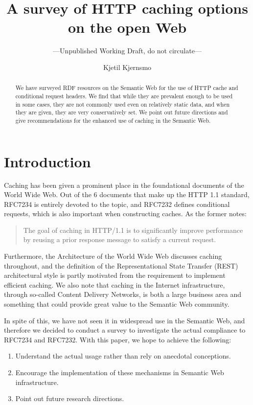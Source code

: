 \documentclass{llncs}
\title{A survey of HTTP caching options on the open Web}
\author{Kjetil Kjernsmo}
\institute{Department of Informatics,
Postboks 1080 Blindern,
N-0316 Oslo, Norway \email{kjetil@kjernsmo.net}}
\subtitle{---Unpublished Working Draft, do not circulate---}
\begin{document}
\maketitle

\begin{abstract}
We have surveyed RDF resources on the Semantic Web for the use of HTTP
cache and conditional request headers. We find that while they are
prevalent enough to be used in some cases, they are not commonly used
even on relatively static data, and when they are given, they are very
conservatively set. We point out future directions and give
recommendations for the enhanced use of caching in the Semantic Web.
\end{abstract}

\section{Introduction}

Caching has been given a prominent place in the foundational documents
of the World Wide Web. Out of the 6 documents that make up the HTTP
1.1 standard, RFC7234 \cite{rfc7234} is entirely devoted to the topic,
and RFC7232 \cite{rfc7232} defines conditional requests, which is also
important when constructing caches. As the former notes:
\begin{quote} 
  The goal of caching in HTTP/1.1 is to significantly improve
  performance by reusing a prior response message to satisfy a current
  request.
\end{quote}
Furthermore, the Architecture of the World Wide Web
\cite{Jacobs:04:AWW} discusses caching throughout, and the definition
of the Representational State Transfer (REST) architectural style
\cite{Fielding_2000_Architectural-Styles} is partly motivated from the
requirement to implement efficient caching. We also note that caching
in the Internet infrastructure, through so-called Content Delivery
Networks, is both a large business area and something that could
provide great value to the Semantic Web community.

In spite of this, we have not seen it in widespread use in the
Semantic Web, and therefore we decided to conduct a survey to
investigate the actual compliance to RFC7234 and RFC7232. 
With this paper, we hope to achieve the following:
\begin{enumerate}
\item Understand the actual usage rather than rely on anecdotal
  conceptions.
\item Encourage the implementation of these mechanisms in Semantic Web
  infrastructure.
\item Point out future research directions.
\end{enumerate}
\end{document}
